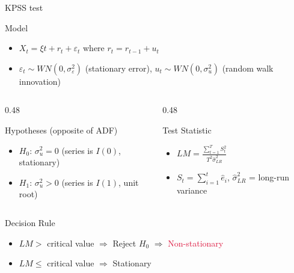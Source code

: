 \documentclass[9pt, aspectratio=169, t]{beamer}
\begin{document}
\begin{frame}{KPSS test}
    \begin{block}{Model}
        \begin{itemize}\setlength{\itemsep}{0pt}
            \item $X_t = \xi t + r_t + \varepsilon_t$ where $r_t = r_{t-1} + u_t$
            \item $\varepsilon_t \sim WN(0, \sigma_\varepsilon^2)$ (stationary error), \; $u_t \sim WN(0, \sigma_u^2)$ (random walk innovation)
        \end{itemize}
    \end{block}

    \vspace{0.1cm}

    \begin{columns}[T]
        \begin{column}{0.48\textwidth}
            \begin{exampleblock}{Hypotheses (opposite of ADF)}
                \begin{itemize}\setlength{\itemsep}{0pt}
                    \item \textbf{$H_0$}: $\sigma_u^2 = 0$ \; (series is $I(0)$, stationary)
                    \item \textbf{$H_1$}: $\sigma_u^2 > 0$ \; (series is $I(1)$, unit root)
                \end{itemize}
            \end{exampleblock}
        \end{column}
        \begin{column}{0.48\textwidth}
            \begin{block}{Test Statistic}
                \begin{itemize}\setlength{\itemsep}{0pt}
                    \item $LM = \frac{\sum_{t=1}^{T} S_t^2}{T^2 \hat{\sigma}^2_{LR}}$
                    \item {\small $S_t = \sum_{i=1}^{t} \hat{e}_i$, \; $\hat{\sigma}^2_{LR}$ = long-run variance}
                \end{itemize}
            \end{block}
        \end{column}
    \end{columns}

    \vspace{0.1cm}

    \begin{alertblock}{Decision Rule}
        \begin{itemize}\setlength{\itemsep}{0pt}
            \item $LM >$ critical value $\Rightarrow$ Reject $H_0$ $\Rightarrow$ \textcolor{Crimson}{Non-stationary}
            \item $LM \leq$ critical value $\Rightarrow$ \textcolor{Forest}{Stationary}
        \end{itemize}
    \end{alertblock}
\end{frame}
\end{document}
